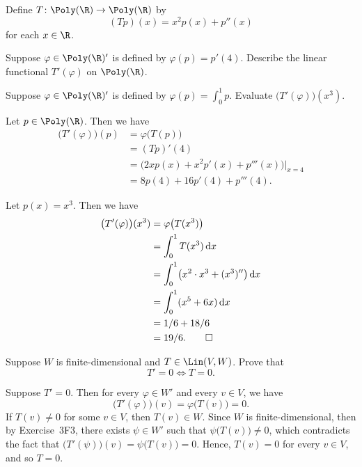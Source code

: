\begin{exc}
\begin{exercise}
Define $T\colon\Poly(\R)\to\Poly(\R)$ by
\[ (Tp)(x) = x^2p(x)+p''(x) \]
for each $x\in\R$.
\begin{parts}
\item Suppose $\varphi\in\Poly(\R)'$ is defined by $\varphi(p)=p'(4)$. Describe
  the linear functional $T'(\varphi)$ on $\Poly(\R)$.
\item Suppose $\varphi\in\Poly(\R)'$ is defined by $\varphi(p)=\int_0^1p$.
  Evaluate $\bigl(T'(\varphi)\bigr)(x^3)$.
\end{parts}
\end{exercise}
\begin{solution}\leavevmode
\begin{parts}
\item Let $p\in\Poly(\R)$. Then we have
  \begin{align*}
  \bigl(T'(\varphi)\bigr)(p) &= \varphi\bigl(T(p)\bigr)\\
   &= (Tp)'(4)\\
   &= \bigl(2xp(x)+x^2p'(x)+p'''(x)\bigr)\big|_{x=4}\\
   &= 8p(4)+16p'(4)+p'''(4).
  \end{align*}
\item Let $p(x)=x^3$. Then we have
  \begin{align*}
  \bigl(T'(\varphi)\bigr)(x^3) &= \varphi\bigl(T(x^3)\bigr)\\
   &= \int_0^1 T(x^3)\,\mathrm{d}x\\
   &= \int_0^1 \bigl(x^2\cdot x^3+(x^3)''\bigr)\,\mathrm{d}x\\
   &= \int_0^1 (x^5+6x)\,\mathrm{d}x\\
   &= 1/6+18/6\\
   &= 19/6. \qedhere
  \end{align*}
\end{parts}
\end{solution}

\begin{exercise}
Suppose $W$ is finite-dimensional and $T\in\Lin(V,W)$. Prove that
\[ T'=0 \iff T=0. \]
\end{exercise}
\begin{solution}
Suppose $T'=0$. Then for every $\varphi\in W'$ and every $v\in V$, we have
\[ \bigl(T'(\varphi)\bigr)(v) = \varphi\bigl(T(v)\bigr) = 0. \]
If $T(v)\ne0$ for some $v\in V$, then $T(v)\in W$. Since $W$ is
finite-dimensional, then by Exercise~3F3, there exists $\psi\in W'$ such that
$\psi\bigl(T(v)\bigr)\ne0$, which contradicts the fact that
$\bigl(T'(\psi)\bigr)(v)=\psi\bigl(T(v)\bigr)=0$. Hence, $T(v)=0$ for every
$v\in V$, and so $T=0$.


\end{solution}
\end{exc}
